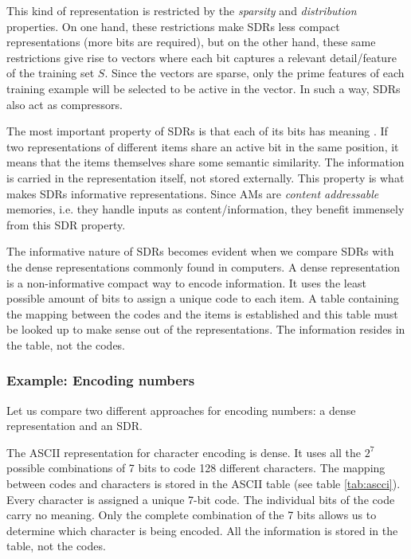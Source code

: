 \documentclass{article}
\begin{document}
This kind of representation is restricted by the \textit{sparsity} and \textit{distribution} properties. On one hand, these restrictions make SDRs less compact representations (more bits are required), but on the other hand, these same restrictions give rise to vectors where each bit captures a relevant detail/feature of the training set $S$.
Since the vectors are sparse, only the prime features of each training example will be selected to be active in the vector. In such a way, SDRs also act as compressors.

The most important property of SDRs is that each of its bits has meaning \cite{Hawkins-et-al-2016-Book}. If two representations of different items share an active bit in the same position, it means that the items themselves share some semantic similarity. The information is carried in the representation itself, not stored externally. This property is what makes SDRs informative representations.
Since AMs are \textit{content addressable} memories, i.e. they handle inputs as content/information, they benefit immensely from this SDR property.

The informative nature of SDRs becomes evident when we compare SDRs with the dense representations commonly found in computers. A dense representation is a non-informative compact way to encode information. It uses the least possible amount of bits to assign a unique code to each item. A table containing the mapping between the codes and the items is established and this table must be looked up to make sense out of the representations. The information resides in the table, not the codes.

\subsubsection{Example: Encoding numbers}
Let us compare two different approaches for encoding numbers: a dense representation and an SDR.

The ASCII representation for character encoding is dense. It uses all the $2^7$ possible combinations of 7 bits to code 128 different characters. The mapping between codes and characters is stored in the ASCII table (see table \ref{tab:ascci}). Every character is assigned a unique 7-bit code. The individual bits of the code carry no meaning. Only the complete combination of the 7 bits allows us to determine which character is being encoded. All the information is stored in the table, not the codes.
\end{document}
